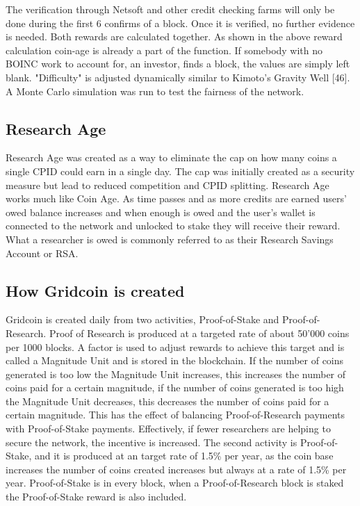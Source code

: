 The verification through Netsoft and other credit checking farms will only be done during the first 6 confirms of a block. Once it is verified, no further evidence is needed. Both rewards are calculated together. As shown in the above reward calculation coin-age is already a part of the function. If somebody with no BOINC work to account for, an investor, finds a block, the values are simply left blank. "Difficulty" is adjusted dynamically similar to Kimoto's Gravity Well [46]. A Monte Carlo simulation was run to test the fairness of the network.

\subsection{Research Age}

Research Age was created as a way to eliminate the cap on how many coins a single CPID could earn in a single day. The cap was initially created as a security measure but lead to reduced competition and CPID splitting. Research Age works much like Coin Age. As time passes and as more credits are earned users' owed balance increases and when enough is owed and the user's wallet is connected to the network and unlocked to stake they will receive their reward. What a researcher is owed is commonly referred to as their Research Savings Account or RSA.


\subsection{How Gridcoin is created}

Gridcoin is created daily from two activities, Proof-of-Stake and Proof-of-Research. Proof of Research is produced at a targeted rate of about 50'000 coins per 1000 blocks. A factor is used to adjust rewards to achieve this target and is called a Magnitude Unit and is stored in the blockchain. If the number of coins generated is too low the Magnitude Unit increases, this increases the number of coins paid for a certain magnitude, if the number of coins generated is too high the Magnitude Unit decreases, this decreases the number of coins paid for a certain magnitude. This has the effect of balancing Proof-of-Research payments with Proof-of-Stake payments. Effectively, if fewer researchers are helping to secure the network, the incentive is increased. The second activity is Proof-of-Stake, and it is produced at an target rate of 1.5\% per year, as the coin base increases the number of coins created increases but always at a rate of 1.5\% per year. Proof-of-Stake is in every block, when a Proof-of-Research block is staked the Proof-of-Stake reward is also included.

